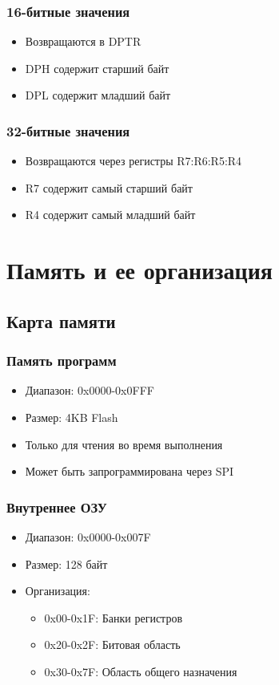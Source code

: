 \documentclass[a4paper, 12pt]{article}
\begin{document}
\subsubsection{16-битные значения}
\begin{itemize}
    \item Возвращаются в DPTR
    \item DPH содержит старший байт
    \item DPL содержит младший байт
\end{itemize}

\subsubsection{32-битные значения}
\begin{itemize}
    \item Возвращаются через регистры R7:R6:R5:R4
    \item R7 содержит самый старший байт
    \item R4 содержит самый младший байт
\end{itemize}

\section{Память и ее организация}
\subsection{Карта памяти}
\subsubsection{Память программ}
\begin{itemize}
    \item Диапазон: 0x0000-0x0FFF
    \item Размер: 4KB Flash
    \item Только для чтения во время выполнения
    \item Может быть запрограммирована через SPI
\end{itemize}

\subsubsection{Внутреннее ОЗУ}
\begin{itemize}
    \item Диапазон: 0x0000-0x007F
    \item Размер: 128 байт
    \item Организация:
    \begin{itemize}
        \item 0x00-0x1F: Банки регистров
        \item 0x20-0x2F: Битовая область
        \item 0x30-0x7F: Область общего назначения
    \end{itemize}
\end{itemize}
\end{document}
